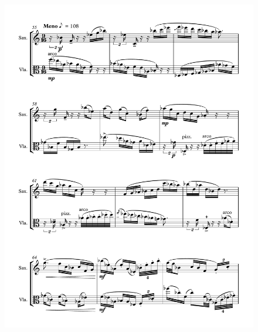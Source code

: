 \begin{figure}[htbp]
    \centering
	\includegraphics[width=6.5in]{figures/Sax_Viola_26.pdf}
\end{figure}

